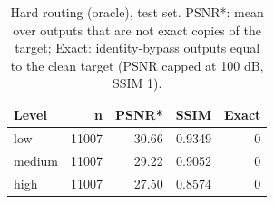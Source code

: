 \begin{table}[t]
\centering
\caption{Hard routing (oracle), test set. PSNR*: mean over outputs that are not exact copies of the target; Exact: identity-bypass outputs equal to the clean target (PSNR capped at 100 dB, SSIM 1).}
\label{tab:t2_routing_oracle_by_level}
\begin{tabular}{lrrrr}
\toprule
Level & n & PSNR* & SSIM & Exact \\
\midrule
low & 11007 & 30.66 & 0.9349 & 0 \\
medium & 11007 & 29.22 & 0.9052 & 0 \\
high & 11007 & 27.50 & 0.8574 & 0 \\
\bottomrule
\end{tabular}
\end{table}
